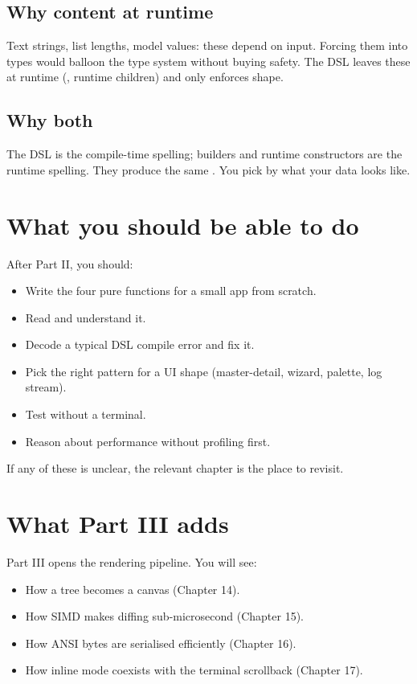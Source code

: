 \subsection*{Why content at runtime}

Text strings, list lengths, model values: these depend on
input. Forcing them into types would balloon the type system
without buying safety. The DSL leaves these at runtime
(, runtime children) and only enforces shape.

\subsection*{Why both}

The DSL is the compile-time spelling; builders and runtime
constructors are the runtime spelling. They produce the same
. You pick by what your data looks like.

\section{What you should be able to do}

After Part II, you should:

\begin{itemize}[leftmargin=*]
  \item Write the four pure functions for a small app from
    scratch.
  \item Read  and
    understand it.
  \item Decode a typical DSL compile error and fix it.
  \item Pick the right pattern for a UI shape (master-detail,
    wizard, palette, log stream).
  \item Test  without a terminal.
  \item Reason about performance without profiling first.
\end{itemize}

If any of these is unclear, the relevant chapter is the place
to revisit.

\section{What Part III adds}

Part III opens the rendering pipeline. You will see:

\begin{itemize}[leftmargin=*]
  \item How a tree becomes a canvas (Chapter 14).
  \item How SIMD makes diffing sub-microsecond (Chapter 15).
  \item How ANSI bytes are serialised efficiently (Chapter 16).
  \item How inline mode coexists with the terminal scrollback
    (Chapter 17).
\end{itemize}

